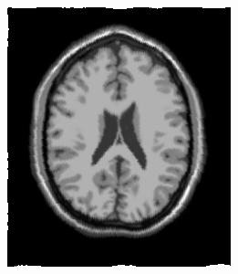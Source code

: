 \begin{figure}[h]
\begin{subfigure}[t]{0.23\textwidth}
	  \label{fig:sindist-image} 
	\end{subfigure} \\
	\begin{subfigure}[t]{0.25\textwidth}
	  \includegraphics[width=\textwidth]{figuras/resultSin.png}
	  \label{fig:sin-image-tps} 
	\end{subfigure}
	\begin{subfigure}[t]{0.25\textwidth}

\end{subfigure}
\end{figure}
